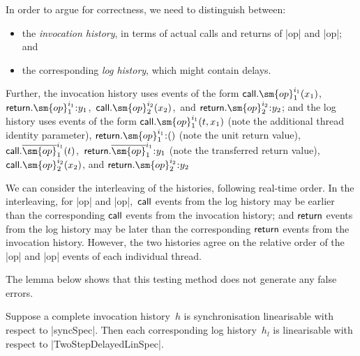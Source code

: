 In order to argue for correctness, we need to distinguish between:
%
\begin{itemize}
\item the \emph{invocation history}, in terms of actual calls and returns of
  |op| and |op|; and

\item the corresponding \emph{log history}, which might contain delays.
\end{itemize}
%
Further, the invocation history uses events of the form
$\call.\sm{op}_1^{i_1}(x_1)$,\, $\return.\sm{op}_1^{i_1} \:: y_1$,\,
$\call.\sm{op}_2^{i_2}(x_2)$,\, and $\return.\sm{op}_2^{i_2} \:: y_2$; and the
log history uses events of the form $\call.\sm{op}_1^{i_1}(t,x_1)$ (note the
additional thread identity parameter), $\return.\sm{op}_1^{i_1} \:: ()$ (note
the unit return value), $\call.\overline{\sm{op}}_1^{i_1}(t)$,\,
$\return.\overline{\sm{op}}_1^{i_1} \:: y_1$ (note the transferred return
value), $\call.\sm{op}_2^{i_2}(x_2)$, and $\return.\sm{op}_2^{i_2} \:: y_2$

We can consider the interleaving of the histories, following real-time order.
In the interleaving, for |op| and |op|,\, $\mathsf{call}$ events from the log
history may be earlier than the corresponding $\mathsf{call}$ events from the
invocation history; and $\mathsf{return}$ events from the log history may be later
than the corresponding $\mathsf{return}$ events from the invocation history.  However,
the two histories agree on the relative order of the |op| and |op| events
of each individual thread.

The lemma below shows that this testing method does not generate any false
errors. 
%
\begin{lemma}
Suppose a complete invocation history~$h$ is synchronisation linearisable with
respect to |syncSpec|.  Then each corresponding log history~$h_l$ is
linearisable with respect to |TwoStepDelayedLinSpec|.
\end{lemma}

